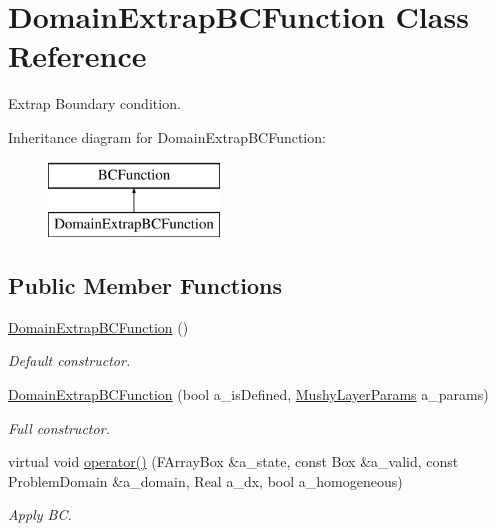 \hypertarget{class_domain_extrap_b_c_function}{\section{Domain\-Extrap\-B\-C\-Function Class Reference}
\label{class_domain_extrap_b_c_function}
}


Extrap Boundary condition.  


Inheritance diagram for Domain\-Extrap\-B\-C\-Function\-:\begin{figure}[H]
\begin{center}
\leavevmode
\includegraphics[height=2.000000cm]{class_domain_extrap_b_c_function}
\end{center}
\end{figure}
\subsection*{Public Member Functions}
\begin{DoxyCompactItemize}
\item 
\hypertarget{class_domain_extrap_b_c_function_a55a5528b06fed1fb88b785cf7d87fecc}{\hyperlink{class_domain_extrap_b_c_function_a55a5528b06fed1fb88b785cf7d87fecc}{Domain\-Extrap\-B\-C\-Function} ()}\label{class_domain_extrap_b_c_function_a55a5528b06fed1fb88b785cf7d87fecc}

\begin{DoxyCompactList}\small\item\em Default constructor. \end{DoxyCompactList}\item 
\hypertarget{class_domain_extrap_b_c_function_ad083a3d037a1a95e4f9dbcca09510379}{\hyperlink{class_domain_extrap_b_c_function_ad083a3d037a1a95e4f9dbcca09510379}{Domain\-Extrap\-B\-C\-Function} (bool a\-\_\-is\-Defined, \hyperlink{class_mushy_layer_params}{Mushy\-Layer\-Params} a\-\_\-params)}\label{class_domain_extrap_b_c_function_ad083a3d037a1a95e4f9dbcca09510379}

\begin{DoxyCompactList}\small\item\em Full constructor. \end{DoxyCompactList}\item 
\hypertarget{class_domain_extrap_b_c_function_a0131a3747f9d742a4c802aa460805f5f}{virtual void \hyperlink{class_domain_extrap_b_c_function_a0131a3747f9d742a4c802aa460805f5f}{operator()} (F\-Array\-Box \&a\-\_\-state, const Box \&a\-\_\-valid, const Problem\-Domain \&a\-\_\-domain, Real a\-\_\-dx, bool a\-\_\-homogeneous)}\label{class_domain_extrap_b_c_function_a0131a3747f9d742a4c802aa460805f5f}

\begin{DoxyCompactList}\small\item\em Apply B\-C. \end{DoxyCompactList}\end{DoxyCompactItemize}

